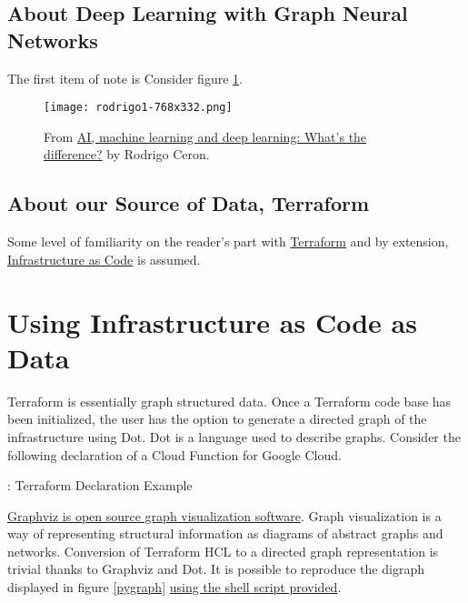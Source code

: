 \subsection{\label{sec:DL}About Deep Learning with Graph Neural Networks}

\justifying
The first item of note is Consider figure \ref{aimldl}.
\vspace{2mm}

\begin{figure}[H]
	\texttt{[image: rodrigo1-768x332.png]}
	\caption{From \href{https://www.ibm.com/blogs/systems/ai-machine-learning-and-deep-learning-whats-the-difference/}{AI, machine learning and deep learning: What’s the difference?} by Rodrigo Ceron.}
	\label{aimldl}
\end{figure}

\subsection{\label{sec:terraform}About our Source of Data, Terraform}

\justifying
Some level of familiarity on the reader's part with \href{https://www.terraform.io/intro/index.html}{Terraform} and
by extension, \href{https://learn.hashicorp.com/tutorials/terraform/infrastructure-as-code}{Infrastructure as Code} is
assumed. 
\vspace{2mm}

\section{\label{sec:iacdata}Using Infrastructure as Code as Data}

\justifying
Terraform is essentially graph structured data. Once a Terraform code base has been initialized, the user has the option to generate
a directed graph of the infrastructure using Dot. Dot is a language used to describe graphs. Consider the following declaration of a
Cloud Function for Google Cloud.

\begin{mybox}{\thetcbcounter: Terraform Declaration Example}
    
\end{mybox}

\justifying
\href{https://graphviz.org/}{Graphviz is open source graph visualization software}. Graph visualization is a way
of representing structural information as diagrams of abstract graphs and networks. 
Conversion of Terraform HCL to a directed graph representation is trivial thanks to Graphviz and Dot. It is possible to reproduce the
digraph displayed in figure \ref{pygraph} \href{https://github.com/devsecfranklin/model-graph-neural-net/blob/main/paper/code/gen_graph.sh}{using the shell script provided}.

